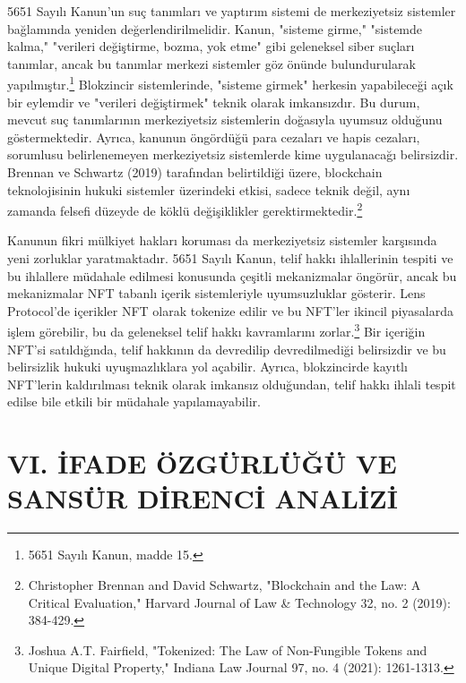\documentclass[11pt,a4paper]{article}
\begin{document}
5651 Sayılı Kanun'un suç tanımları ve yaptırım sistemi de merkeziyetsiz sistemler bağlamında yeniden değerlendirilmelidir. Kanun, "sisteme girme," "sistemde kalma," "verileri değiştirme, bozma, yok etme" gibi geleneksel siber suçları tanımlar, ancak bu tanımlar merkezi sistemler göz önünde bulundurularak yapılmıştır.\footnote{5651 Sayılı Kanun, madde 15.} Blokzincir sistemlerinde, "sisteme girmek" herkesin yapabileceği açık bir eylemdir ve "verileri değiştirmek" teknik olarak imkansızdır. Bu durum, mevcut suç tanımlarının merkeziyetsiz sistemlerin doğasıyla uyumsuz olduğunu göstermektedir. Ayrıca, kanunun öngördüğü para cezaları ve hapis cezaları, sorumlusu belirlenemeyen merkeziyetsiz sistemlerde kime uygulanacağı belirsizdir. Brennan ve Schwartz (2019) tarafından belirtildiği üzere, blockchain teknolojisinin hukuki sistemler üzerindeki etkisi, sadece teknik değil, aynı zamanda felsefi düzeyde de köklü değişiklikler gerektirmektedir.\footnote{Christopher Brennan and David Schwartz, "Blockchain and the Law: A Critical Evaluation," Harvard Journal of Law & Technology 32, no. 2 (2019): 384-429.}

Kanunun fikri mülkiyet hakları koruması da merkeziyetsiz sistemler karşısında yeni zorluklar yaratmaktadır. 5651 Sayılı Kanun, telif hakkı ihlallerinin tespiti ve bu ihlallere müdahale edilmesi konusunda çeşitli mekanizmalar öngörür, ancak bu mekanizmalar NFT tabanlı içerik sistemleriyle uyumsuzluklar gösterir. Lens Protocol'de içerikler NFT olarak tokenize edilir ve bu NFT'ler ikincil piyasalarda işlem görebilir, bu da geleneksel telif hakkı kavramlarını zorlar.\footnote{Joshua A.T. Fairfield, "Tokenized: The Law of Non-Fungible Tokens and Unique Digital Property," Indiana Law Journal 97, no. 4 (2021): 1261-1313.} Bir içeriğin NFT'si satıldığında, telif hakkının da devredilip devredilmediği belirsizdir ve bu belirsizlik hukuki uyuşmazlıklara yol açabilir. Ayrıca, blokzincirde kayıtlı NFT'lerin kaldırılması teknik olarak imkansız olduğundan, telif hakkı ihlali tespit edilse bile etkili bir müdahale yapılamayabilir.

\section*{\fontsize{12}{14}\selectfont\bfseries VI. İFADE ÖZGÜRLÜĞÜ VE SANSÜR DİRENCİ ANALİZİ}
\end{document}
